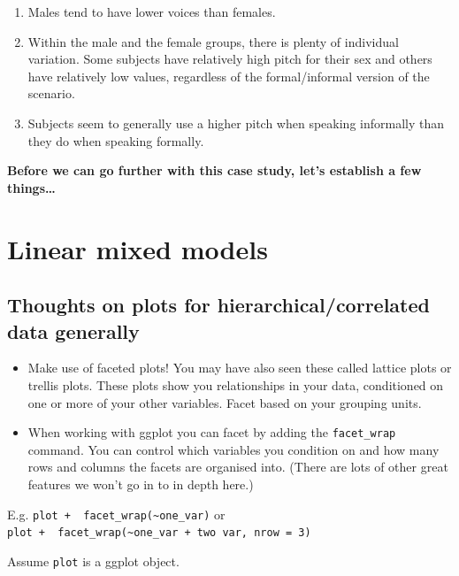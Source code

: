\documentclass[
  openany]{book}
\providecommand{\tightlist}{%
  \setlength{\itemsep}{0pt}\setlength{\parskip}{0pt}}
\begin{document}
\begin{enumerate}
\def\labelenumi{\arabic{enumi}.}
\tightlist
\item
  Males tend to have lower voices than females.
\item
  Within the male and the female groups, there is plenty of individual variation. Some subjects have relatively high pitch for their sex and others have relatively low values, regardless of the formal/informal version of the scenario.
\item
  Subjects seem to generally use a higher pitch when speaking informally than they do when speaking formally.
\end{enumerate}

\textbf{Before we can go further with this case study, let's establish a few things\ldots{}}

\hypertarget{linear-mixed-models}{%
\section{Linear mixed models}\label{linear-mixed-models}}

\hypertarget{thoughts-on-plots-for-hierarchicalcorrelated-data-generally}{%
\subsection{Thoughts on plots for hierarchical/correlated data generally}\label{thoughts-on-plots-for-hierarchicalcorrelated-data-generally}}

\begin{itemize}
\tightlist
\item
  Make use of faceted plots! You may have also seen these called lattice plots or trellis plots. These plots show you relationships in your data, conditioned on one or more of your other variables. Facet based on your grouping units.
\item
  When working with ggplot you can facet by adding the \texttt{facet\_wrap} command. You can control which variables you condition on and how many rows and columns the facets are organised into. (There are lots of other great features we won't go in to in depth here.)
\end{itemize}

E.g. \texttt{plot\ +\ \ facet\_wrap(\textasciitilde{}one\_var)} or
\texttt{plot\ +\ \ facet\_wrap(\textasciitilde{}one\_var\ +\ two\ var,\ nrow\ =\ 3)}

Assume \texttt{plot} is a ggplot object.
\end{document}
